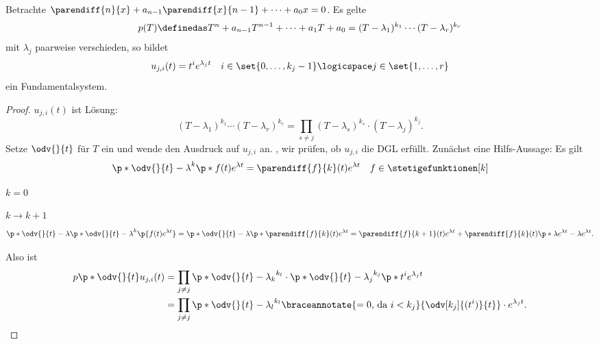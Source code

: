 \begin{lemma}\label{fundamentalsystem_homogene_lineare_dgl_nter_ordnungW}
  Betrachte \( \parendiff{n}{x}+a_{n-1}\parendiff{x}{n-1}+\dotsb+a_0 x=0  \). Es gelte
  \begin{equation*}
    p(T)\definedas T^n+ a_{n-1}T^{n-1}+\dotsb+a_1 T+a_0=(T-\lambda_1)^{k_1}\dotsm (T-\lambda_r)^{k_r}
  \end{equation*}
  mit \( \lambda_j \) paarweise verschieden, so bildet
  \begin{equation*}
    u_{j,i}(t)=t^i e^{\lambda_j t}\quad i\in \set{0,\dotsc,k_j -1}\logicspace j\in \set{1,\dotsc,r}
  \end{equation*}
  ein Fundamentalsystem.
\end{lemma}
\begin{proof}
  \( u_{j,i}(t) \) ist Lösung:
  \begin{equation*}
    (T-\lambda_1)^{k_1}\dotsm (T-\lambda_r)^{k_r}=\prod_{s\neq j}(T-\lambda_s)^{k_s}\cdot(T-\lambda_j)^{k_j}.
  \end{equation*}
  Setze \( \odv{}{t} \) für \( T \) ein und wende den Ausdruck auf \( u_{j,i} \) an. \Dh, wir prüfen, ob \( u_{j,i} \) die DGL erfüllt. Zunächst eine Hilfs-Aussage: Es gilt
  \begin{equation*}
    \p*{\odv{}{t}-\lambda}^k \p*{f(t)e^{\lambda t}}=\parendiff{f}{k}(t)e^{\lambda t}\quad f\in \stetigefunktionen[k]
  \end{equation*}
  \begin{subproof}
    \begin{proofdescription}
      \item[\( k=0 \)] \checkmark
      \item[\( k \to k+1 \)] \begin{equation*}
        \p*{\odv{}{t}-\lambda}\p*{\odv{}{t}-\lambda}^k\p{f(t)e^{\lambda t}}=\p*{\odv{}{t}-\lambda}\p*{\parendiff{f}{k}(t)e^{\lambda t}}=\parendiff{f}{k+1}(t)e^{\lambda t}+\parendiff{f}{k}(t)\p*{\lambda e^{\lambda t}-\lambda e^{\lambda t}}.
      \end{equation*} 
    \end{proofdescription}
  \end{subproof}
  Also ist
  \begin{align*}
    p\p*{\odv{}{t}} u_{j,i}(t)&=\prod_{j\neq j} \p*{\odv{}{t}-\lambda_k}^{k_l}\cdot \p*{\odv{}{t}-\lambda_j}^{k_j}\p*{t^i e^{\lambda_j t}}\\
    &=\prod_{j\neq j}\p*{\odv{}{t}-\lambda_l}^{k_l}\braceannotate{=0 \text{, da \( i<k_j \)}}{\odv[k_j]{(t^i)}{t}}\cdot e^{\lambda_j t}.

\end{align*}
\end{proof}
